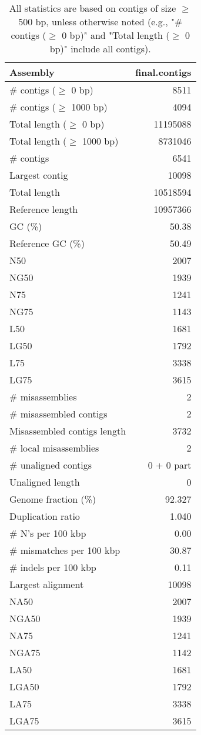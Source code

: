 \documentclass[12pt,a4paper]{article}
\begin{document}
\begin{table}[ht]
\begin{center}
\caption{All statistics are based on contigs of size $\geq$ 500 bp, unless otherwise noted (e.g., "\# contigs ($\geq$ 0 bp)" and "Total length ($\geq$ 0 bp)" include all contigs).}
\begin{tabular}{|l*{1}{|r}|}
\hline
Assembly & final.contigs \\ \hline
\# contigs ($\geq$ 0 bp) & 8511 \\ \hline
\# contigs ($\geq$ 1000 bp) & 4094 \\ \hline
Total length ($\geq$ 0 bp) & 11195088 \\ \hline
Total length ($\geq$ 1000 bp) & 8731046 \\ \hline
\# contigs & 6541 \\ \hline
Largest contig & 10098 \\ \hline
Total length & 10518594 \\ \hline
Reference length & 10957366 \\ \hline
GC (\%) & 50.38 \\ \hline
Reference GC (\%) & 50.49 \\ \hline
N50 & 2007 \\ \hline
NG50 & 1939 \\ \hline
N75 & 1241 \\ \hline
NG75 & 1143 \\ \hline
L50 & 1681 \\ \hline
LG50 & 1792 \\ \hline
L75 & 3338 \\ \hline
LG75 & 3615 \\ \hline
\# misassemblies & 2 \\ \hline
\# misassembled contigs & 2 \\ \hline
Misassembled contigs length & 3732 \\ \hline
\# local misassemblies & 2 \\ \hline
\# unaligned contigs & 0 + 0 part \\ \hline
Unaligned length & 0 \\ \hline
Genome fraction (\%) & 92.327 \\ \hline
Duplication ratio & 1.040 \\ \hline
\# N's per 100 kbp & 0.00 \\ \hline
\# mismatches per 100 kbp & 30.87 \\ \hline
\# indels per 100 kbp & 0.11 \\ \hline
Largest alignment & 10098 \\ \hline
NA50 & 2007 \\ \hline
NGA50 & 1939 \\ \hline
NA75 & 1241 \\ \hline
NGA75 & 1142 \\ \hline
LA50 & 1681 \\ \hline
LGA50 & 1792 \\ \hline
LA75 & 3338 \\ \hline
LGA75 & 3615 \\ \hline
\end{tabular}
\end{center}
\end{table}
\end{document}
